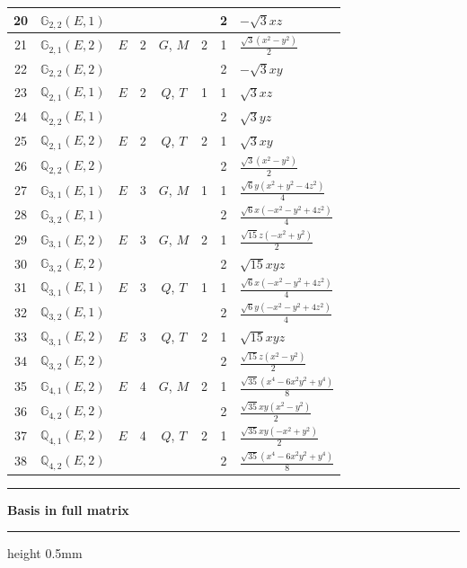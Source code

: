 \documentclass[fleqn,10pt,landscape]{jsarticle}
\begin{document}
\begin{longtable}[l]{clcccccl}
20 & $\mathbb{G}_{2,2}(E,1)$ &  &  &  &  & 2 & $- \sqrt{3} x z$ \\ \hline
21 & $\mathbb{G}_{2,1}(E,2)$ & $E$ & 2 & $G$, $M$ & 2 & 1 & $\frac{\sqrt{3} \left(x^{2} - y^{2}\right)}{2}$ \\
22 & $\mathbb{G}_{2,2}(E,2)$ &  &  &  &  & 2 & $- \sqrt{3} x y$ \\ \hline
23 & $\mathbb{Q}_{2,1}(E,1)$ & $E$ & 2 & $Q$, $T$ & 1 & 1 & $\sqrt{3} x z$ \\
24 & $\mathbb{Q}_{2,2}(E,1)$ &  &  &  &  & 2 & $\sqrt{3} y z$ \\ \hline
25 & $\mathbb{Q}_{2,1}(E,2)$ & $E$ & 2 & $Q$, $T$ & 2 & 1 & $\sqrt{3} x y$ \\
26 & $\mathbb{Q}_{2,2}(E,2)$ &  &  &  &  & 2 & $\frac{\sqrt{3} \left(x^{2} - y^{2}\right)}{2}$ \\ \hline
27 & $\mathbb{G}_{3,1}(E,1)$ & $E$ & 3 & $G$, $M$ & 1 & 1 & $\frac{\sqrt{6} y \left(x^{2} + y^{2} - 4 z^{2}\right)}{4}$ \\
28 & $\mathbb{G}_{3,2}(E,1)$ &  &  &  &  & 2 & $\frac{\sqrt{6} x \left(- x^{2} - y^{2} + 4 z^{2}\right)}{4}$ \\ \hline
29 & $\mathbb{G}_{3,1}(E,2)$ & $E$ & 3 & $G$, $M$ & 2 & 1 & $\frac{\sqrt{15} z \left(- x^{2} + y^{2}\right)}{2}$ \\
30 & $\mathbb{G}_{3,2}(E,2)$ &  &  &  &  & 2 & $\sqrt{15} x y z$ \\ \hline
31 & $\mathbb{Q}_{3,1}(E,1)$ & $E$ & 3 & $Q$, $T$ & 1 & 1 & $\frac{\sqrt{6} x \left(- x^{2} - y^{2} + 4 z^{2}\right)}{4}$ \\
32 & $\mathbb{Q}_{3,2}(E,1)$ &  &  &  &  & 2 & $\frac{\sqrt{6} y \left(- x^{2} - y^{2} + 4 z^{2}\right)}{4}$ \\ \hline
33 & $\mathbb{Q}_{3,1}(E,2)$ & $E$ & 3 & $Q$, $T$ & 2 & 1 & $\sqrt{15} x y z$ \\
34 & $\mathbb{Q}_{3,2}(E,2)$ &  &  &  &  & 2 & $\frac{\sqrt{15} z \left(x^{2} - y^{2}\right)}{2}$ \\ \hline
35 & $\mathbb{G}_{4,1}(E,2)$ & $E$ & 4 & $G$, $M$ & 2 & 1 & $\frac{\sqrt{35} \left(x^{4} - 6 x^{2} y^{2} + y^{4}\right)}{8}$ \\
36 & $\mathbb{G}_{4,2}(E,2)$ &  &  &  &  & 2 & $\frac{\sqrt{35} x y \left(x^{2} - y^{2}\right)}{2}$ \\ \hline
37 & $\mathbb{Q}_{4,1}(E,2)$ & $E$ & 4 & $Q$, $T$ & 2 & 1 & $\frac{\sqrt{35} x y \left(- x^{2} + y^{2}\right)}{2}$ \\
38 & $\mathbb{Q}_{4,2}(E,2)$ &  &  &  &  & 2 & $\frac{\sqrt{35} \left(x^{4} - 6 x^{2} y^{2} + y^{4}\right)}{8}$ \\
\end{longtable}
\vspace{5mm}
\noindent \rule[0.5mm]{5mm}{0.5mm}\hspace{3mm}\textbf{Basis in full matrix}\hspace{3mm}\leaders\hrule height 0.5mm\hfill\kern0pt
\vspace{3mm}
\end{document}
